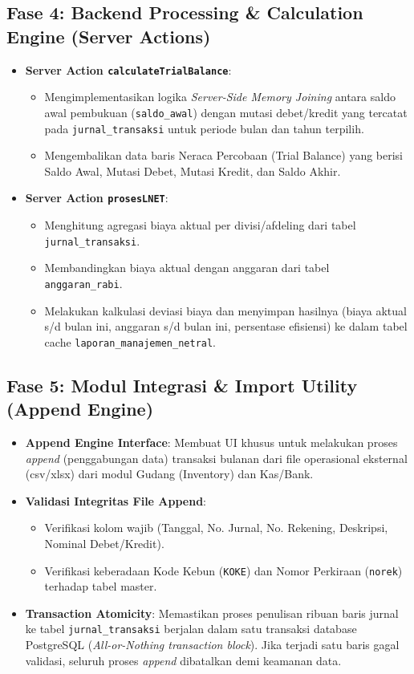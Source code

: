 \documentclass[11pt,a4paper]{article}
\begin{document}
\subsection{Fase 4: Backend Processing \& Calculation Engine (Server Actions)}
\begin{itemize}
    \item \textbf{Server Action \texttt{calculateTrialBalance}}:
    \begin{itemize}
        \item Mengimplementasikan logika \textit{Server-Side Memory Joining} antara saldo awal pembukuan (\texttt{saldo\_awal}) dengan mutasi debet/kredit yang tercatat pada \texttt{jurnal\_transaksi} untuk periode bulan dan tahun terpilih.
        \item Mengembalikan data baris Neraca Percobaan (Trial Balance) yang berisi Saldo Awal, Mutasi Debet, Mutasi Kredit, dan Saldo Akhir.
    \end{itemize}
    \item \textbf{Server Action \texttt{prosesLNET}}:
    \begin{itemize}
        \item Menghitung agregasi biaya aktual per divisi/afdeling dari tabel \texttt{jurnal\_transaksi}.
        \item Membandingkan biaya aktual dengan anggaran dari tabel \texttt{anggaran\_rabi}.
        \item Melakukan kalkulasi deviasi biaya dan menyimpan hasilnya (biaya aktual s/d bulan ini, anggaran s/d bulan ini, persentase efisiensi) ke dalam tabel cache \texttt{laporan\_manajemen\_netral}.
    \end{itemize}
\end{itemize}

\subsection{Fase 5: Modul Integrasi \& Import Utility (Append Engine)}
\begin{itemize}
    \item \textbf{Append Engine Interface}: Membuat UI khusus untuk melakukan proses \textit{append} (penggabungan data) transaksi bulanan dari file operasional eksternal (csv/xlsx) dari modul Gudang (Inventory) dan Kas/Bank.
    \item \textbf{Validasi Integritas File Append}:
    \begin{itemize}
        \item Verifikasi kolom wajib (Tanggal, No. Jurnal, No. Rekening, Deskripsi, Nominal Debet/Kredit).
        \item Verifikasi keberadaan Kode Kebun (\texttt{KOKE}) dan Nomor Perkiraan (\texttt{norek}) terhadap tabel master.
    \end{itemize}
    \item \textbf{Transaction Atomicity}: Memastikan proses penulisan ribuan baris jurnal ke tabel \texttt{jurnal\_transaksi} berjalan dalam satu transaksi database PostgreSQL (\textit{All-or-Nothing transaction block}). Jika terjadi satu baris gagal validasi, seluruh proses \textit{append} dibatalkan demi keamanan data.
\end{itemize}
\end{document}
